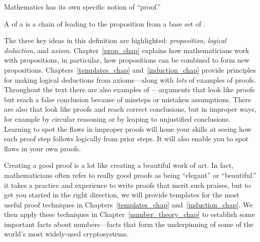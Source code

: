 Mathematics has its own specific notion of ``proof.''

\begin{definition*}
A  of a  is a chain of  leading to the proposition from a base set of .
\end{definition*}

The three key ideas in this definition are highlighted:
\emph{proposition}, \emph{logical deduction}, and \emph{axiom}.
Chapter~\ref{prop_chap} explains how mathematicians work with  propositions, in particular, how propositions can be combined
to form new propositions.  Chapters~\ref{templates_chap}
and~\ref{induction_chap} provide principles for making logical deductions
from axioms---along with \emph{lots} of examples of proofs.  Throughout
the text there are also examples of ---arguments that
look like proofs but reach a false conclusion because of missteps or
mistaken assumptions.   There are also
 that look like proofs and reach correct
 conclusions, but in improper ways, for example
by circular reasoning or by leaping to unjustified conclusions.  Learning
to spot the flaws in improper proofs will hone your skills at seeing how
each proof step follows logically from prior steps.  It will also enable
you to spot flaws in your own proofs.

Creating a good proof is a lot like creating a beautiful work of art.  In
fact, mathematicians often refer to really good proofs as being
``elegant'' or ``beautiful.''  it takes a practice and experience to write
proofs that merit such praises,  but to get you started in
the right direction, we will provide templates for the most useful proof
techniques in Chapters~\ref{templates_chap} and~\ref{induction_chap}.  We
then apply these techniques in Chapter~\ref{number_theory_chap} to
establish some important facts about numbers---facts that form the
 underpinning of some of the world's most
widely-used cryptosystems.



\endinput
